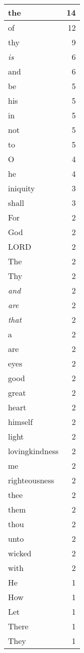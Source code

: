 \begin{center}
\begin{longtable}{l|r}
\hline \hline
\endlastfoot
the & 14 \\ \hline
of & 12 \\ \hline
thy & 9 \\ \hline
\emph{is} & 6 \\ \hline
and & 6 \\ \hline
be & 5 \\ \hline
his & 5 \\ \hline
in & 5 \\ \hline
not & 5 \\ \hline
to & 5 \\ \hline
O & 4 \\ \hline
he & 4 \\ \hline
iniquity & 3 \\ \hline
shall & 3 \\ \hline
For & 2 \\ \hline
God & 2 \\ \hline
LORD & 2 \\ \hline
The & 2 \\ \hline
Thy & 2 \\ \hline
\emph{and} & 2 \\ \hline
\emph{are} & 2 \\ \hline
\emph{that} & 2 \\ \hline
a & 2 \\ \hline
are & 2 \\ \hline
eyes & 2 \\ \hline
good & 2 \\ \hline
great & 2 \\ \hline
heart & 2 \\ \hline
himself & 2 \\ \hline
light & 2 \\ \hline
lovingkindness & 2 \\ \hline
me & 2 \\ \hline
righteousness & 2 \\ \hline
thee & 2 \\ \hline
them & 2 \\ \hline
thou & 2 \\ \hline
unto & 2 \\ \hline
wicked & 2 \\ \hline
with & 2 \\ \hline
He & 1 \\ \hline
How & 1 \\ \hline
Let & 1 \\ \hline
There & 1 \\ \hline
They & 1 \\ \hline

\end{longtable}
\end{center}
